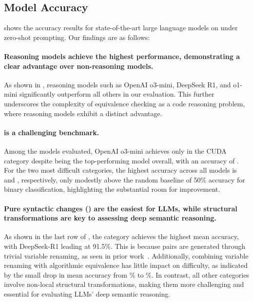 \subsection{Model Accuracy}
\label{subsec:acc}

 shows the accuracy results for \numllm state-of-the-art large language models on \name under zero-shot prompting. Our findings are as follows:

\paragraph{Reasoning models achieve the highest performance, demonstrating a clear advantage over non-reasoning models.} As shown in , reasoning models such as OpenAI o3-mini, DeepSeek R1, and o1-mini significantly outperform all others in our evaluation. This further underscores the complexity of equivalence checking as a code reasoning problem, where reasoning models exhibit a distinct advantage.


\paragraph{\name is a challenging benchmark.} Among the \numllm models evaluated, OpenAI o3-mini achieves only \sotalowacc{} in the CUDA category despite being the top-performing model overall, with an accuracy of \sotaacc{}. For the two most difficult categories, the highest accuracy across all models is \sotacuda{} and \sotadce{}, respectively, only modestly above the random baseline of 50\% accuracy for binary classification, highlighting the substantial room for improvement.

\paragraph{Pure syntactic changes (\ojv) are the easiest for LLMs, while structural transformations are key to assessing deep semantic reasoning.} As shown in the last row of , the \ojv category achieves the highest mean accuracy, with DeepSeek-R1 leading at 91.5\%. This is because \ojv pairs are generated through trivial variable renaming, as seen in prior work~\cite{badihi2021eqbench,maveli2024can}. Additionally, combining variable renaming with algorithmic equivalence has little impact on difficulty, as indicated by the small drop in mean accuracy from \% to \%. In contrast, all other categories involve non-local structural transformations, making them more challenging and essential for evaluating LLMs' deep semantic reasoning.

